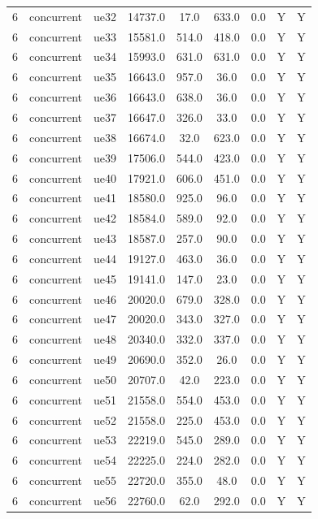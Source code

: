 \begin{table}[ht]
\begin{tabular}{|c|c|c|c|c|c|c|c|c|}
6 & concurrent & ue32 & 14737.0 & 17.0 & 633.0 & 0.0 & Y & Y \\
6 & concurrent & ue33 & 15581.0 & 514.0 & 418.0 & 0.0 & Y & Y \\
6 & concurrent & ue34 & 15993.0 & 631.0 & 631.0 & 0.0 & Y & Y \\
6 & concurrent & ue35 & 16643.0 & 957.0 & 36.0 & 0.0 & Y & Y \\
6 & concurrent & ue36 & 16643.0 & 638.0 & 36.0 & 0.0 & Y & Y \\
6 & concurrent & ue37 & 16647.0 & 326.0 & 33.0 & 0.0 & Y & Y \\
6 & concurrent & ue38 & 16674.0 & 32.0 & 623.0 & 0.0 & Y & Y \\
6 & concurrent & ue39 & 17506.0 & 544.0 & 423.0 & 0.0 & Y & Y \\
6 & concurrent & ue40 & 17921.0 & 606.0 & 451.0 & 0.0 & Y & Y \\
6 & concurrent & ue41 & 18580.0 & 925.0 & 96.0 & 0.0 & Y & Y \\
6 & concurrent & ue42 & 18584.0 & 589.0 & 92.0 & 0.0 & Y & Y \\
6 & concurrent & ue43 & 18587.0 & 257.0 & 90.0 & 0.0 & Y & Y \\
6 & concurrent & ue44 & 19127.0 & 463.0 & 36.0 & 0.0 & Y & Y \\
6 & concurrent & ue45 & 19141.0 & 147.0 & 23.0 & 0.0 & Y & Y \\
6 & concurrent & ue46 & 20020.0 & 679.0 & 328.0 & 0.0 & Y & Y \\
6 & concurrent & ue47 & 20020.0 & 343.0 & 327.0 & 0.0 & Y & Y \\
6 & concurrent & ue48 & 20340.0 & 332.0 & 337.0 & 0.0 & Y & Y \\
6 & concurrent & ue49 & 20690.0 & 352.0 & 26.0 & 0.0 & Y & Y \\
6 & concurrent & ue50 & 20707.0 & 42.0 & 223.0 & 0.0 & Y & Y \\
6 & concurrent & ue51 & 21558.0 & 554.0 & 453.0 & 0.0 & Y & Y \\
6 & concurrent & ue52 & 21558.0 & 225.0 & 453.0 & 0.0 & Y & Y \\
6 & concurrent & ue53 & 22219.0 & 545.0 & 289.0 & 0.0 & Y & Y \\
6 & concurrent & ue54 & 22225.0 & 224.0 & 282.0 & 0.0 & Y & Y \\
6 & concurrent & ue55 & 22720.0 & 355.0 & 48.0 & 0.0 & Y & Y \\
6 & concurrent & ue56 & 22760.0 & 62.0 & 292.0 & 0.0 & Y & Y \\

\end{tabular}
\end{table}
